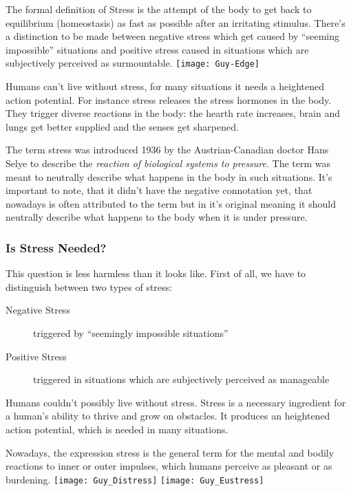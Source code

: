 \documentclass[../main.tex]{subfiles}
\begin{document}
The formal definition of Stress is the attempt of the body to get back to equilibrium (homeostasis) as fast as possible after an irritating stimulus.
There's a distinction to be made between negative stress which get caused by ``seeming impossible''
 situations and positive stress caused in situations which are subjectively perceived as surmountable.
\texttt{[image: Guy-Edge]}\label{sf:edge}

Humans can't live without stress, for many situations it needs a heightened action potential. For instance stress releases the stress hormones in the body. They trigger diverse reactions in the body: the hearth rate increases, brain and lungs get better supplied and the senses get sharpened.

The term stress was introduced 1936 by the Austrian-Canadian doctor Hans Selye to describe the \emph{reaction of biological systems to pressure}. The term was meant to neutrally describe what happens in the body in such situations.
It's important to note, that it didn't have the negative connotation yet, that nowadays is often attributed to the term but in it's original meaning it should neutrally describe what happens to the body when it is under pressure.

\subsubsection{Is Stress Needed?}

This question is less harmless than it looks like. First of all, we have to distinguish between two types of stress:
	\begin{description}
		\item[Negative Stress] triggered by ``seemingly impossible situations''
		\item[Positive Stress] triggered in situations which are subjectively perceived as manageable
	\end{description}
	
Humans couldn't possibly live without stress. Stress is a necessary ingredient for a human's ability to thrive and grow on obstacles. It produces an heightened action potential, which is needed in many situations.

Nowadays, the expression stress is the general term for the mental and bodily reactions to inner or outer impulses, which humans perceive as pleasant or as burdening.
\texttt{[image: Guy\_Distress]}
\hspace{5cm}
\texttt{[image: Guy\_Eustress]}\label{sf:eustress}
\end{document}
